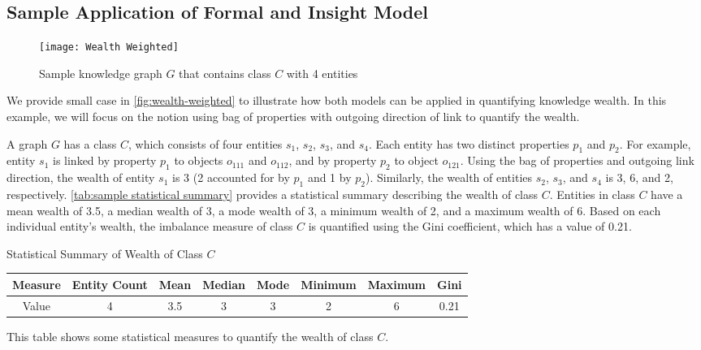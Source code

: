 \subsection{Sample Application of Formal and Insight Model}

\begin{figure}[!htbp]
    \centering
    \texttt{[image: Wealth Weighted]}
    \caption{Sample knowledge graph \(G\) that contains class \(C\) with 4 entities} \label{fig:wealth-weighted}
\end{figure}

We provide small case in \autoref{fig:wealth-weighted} to illustrate how both models can be applied in quantifying knowledge wealth. In this example, we will focus on the notion using bag of properties with outgoing direction of link to quantify the wealth.

A graph \(G\) has a class \(C\), which consists of four entities \(s_1\), \(s_2\), \(s_3\), and \(s_4\). Each entity has two distinct properties \(p_1\) and \(p_2\). For example, entity \(s_1\) is linked by property \(p_1\) to objects \(o_{111}\) and \(o_{112}\), and by property \(p_2\) to object \(o_{121}\). Using the bag of properties and outgoing link direction, the wealth of entity \(s_1\) is 3 (2 accounted for by \(p_1\) and 1 by \(p_2\)). Similarly, the wealth of entities \(s_2\), \(s_3\), and \(s_4\) is 3, 6, and 2, respectively. \autoref{tab:sample statistical summary} provides a statistical summary describing the wealth of class \(C\). Entities in class \(C\) have a mean wealth of 3.5, a median wealth of 3, a mode wealth of 3, a minimum wealth of 2, and a maximum wealth of 6. Based on each individual entity's wealth, the imbalance measure of class \(C\) is quantified using the Gini coefficient, which has a value of 0.21.

\begin{center}
    \scriptsize
    \begin{threeparttable}
    \captionsetup{font=small}
    \caption{Statistical Summary of Wealth of Class \(C\)}
    \label{tab:sample statistical summary}
    \begin{tabular}{c | c c c c c c c} 
    
    \toprule
        Measure & Entity Count & Mean & Median & Mode & Minimum & Maximum & Gini \\ [0.5ex] 
    \midrule
        Value & 4 & 3.5 & 3 & 3 & 2 & 6 & 0.21 \\
        [0.5ex]
    \bottomrule
    \end{tabular}
    \begin{tablenotes}
        \scriptsize
        \item{This table shows some statistical measures to quantify the wealth of class \(C\).}
    \end{tablenotes}
    \end{threeparttable}
\end{center}

